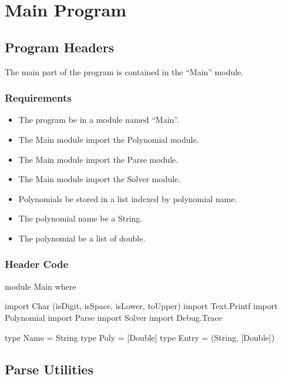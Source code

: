 \chapter{Main Program}
\section{Program Headers}
The main part of the program is contained in the ``Main'' module.
\subsection{Requirements}
\begin{itemize}
\item The program  be in a module named ``Main''.
\item The Main module  import the Polynomial module.
\item The Main module  import the Parse module.
\item The Main module  import the Solver module.
\item Polynomials  be stored in a list indexed by polynomial name.
\item The polynomial name  be a String.
\item The polynomial  be a list of double.
\end{itemize}

\subsection{Header Code}
\begin{code}
module Main where

import Char (isDigit, isSpace, isLower, toUpper)
import Text.Printf
import Polynomial
import Parse
import Solver
import Debug.Trace

type Name = String
type Poly = [Double]
type Entry = (String, [Double])
\end{code}

\section{Parse Utilities}
